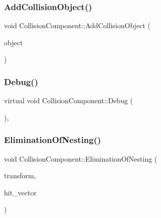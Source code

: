 \subsubsection{\texorpdfstring{Add\+Collision\+Object()}{AddCollisionObject()}}
{\footnotesize\ttfamily void Collision\+Component\+::\+Add\+Collision\+Object (\begin{DoxyParamCaption}\item[{\mbox{\hyperlink{class_collision_object}{Collision\+Object}} $\ast$}]{object }\end{DoxyParamCaption})\hspace{0.3cm}{\ttfamily [inline]}}

\mbox{\label{class_collision_component_a542fdd782214ffe130a4e8cf55bca668}} 
\subsubsection{\texorpdfstring{Debug()}{Debug()}}
{\footnotesize\ttfamily virtual void Collision\+Component\+::\+Debug (\begin{DoxyParamCaption}{ }\end{DoxyParamCaption})\hspace{0.3cm}{\ttfamily [inline]}, {\ttfamily [virtual]}}

\mbox{\label{class_collision_component_a9ec98b8eb17abe18f2f8487393af0954}} 
\subsubsection{\texorpdfstring{Elimination\+Of\+Nesting()}{EliminationOfNesting()}}
{\footnotesize\ttfamily void Collision\+Component\+::\+Elimination\+Of\+Nesting (\begin{DoxyParamCaption}\item[{\mbox{\hyperlink{class_transform}{Transform}} $\ast$}]{transform,  }\item[{const \mbox{\hyperlink{_vector3_d_8h_ab16f59e4393f29a01ec8b9bbbabbe65d}{Vec3}} $\ast$}]{hit\+\_\+vector }\end{DoxyParamCaption})\hspace{0.3cm}{\ttfamily [inline]}}

